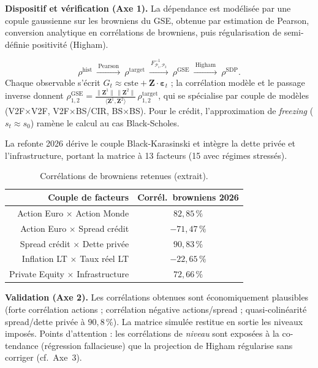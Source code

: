 \documentclass[11pt,a4paper]{article}
\renewcommand{\arraystretch}{1.4}
\newcommand{\tablehead}[1]{\textcolor{nxnavy}{\sffamily\bfseries\small #1}}
\begin{document}
\textbf{Dispositif et vérification (Axe 1).} La dépendance est modélisée par une copule gaussienne sur les browniens du GSE, obtenue par estimation de Pearson, conversion analytique en corrélations de browniens, puis régularisation de semi-définie positivité (Higham).
\begin{definitionbox}
\[
\rho^{\mathrm{hist}}\ \xrightarrow{\ \text{Pearson}\ }\ \rho^{\mathrm{target}}
\ \xrightarrow{\ F^{-1}_{\mathcal P_1,\mathcal P_2}\ }\ \rho^{\mathrm{GSE}}
\ \xrightarrow{\ \text{Higham}\ }\ \rho^{\mathrm{SDP}} .
\]
Chaque observable s'écrit $G_t\approx\text{cste}+\bm Z\cdot\bm\varepsilon_t$ ; la corrélation modèle et le passage inverse donnent $\rho^{\mathrm{GSE}}_{1,2}=\tfrac{\lVert\bm Z^1\rVert\,\lVert\bm Z^2\rVert}{\langle\bm Z^1,\bm Z^2\rangle}\,\rho^{\mathrm{target}}_{1,2}$, qui se spécialise par couple de modèles (V2F$\times$V2F, V2F$\times$BS/CIR, BS$\times$BS). Pour le crédit, l'approximation de \emph{freezing} ($s_t\approx s_0$) ramène le calcul au cas Black-Scholes.
\end{definitionbox}
La refonte 2026 dérive le couple Black-Karasinski et intègre la dette privée et l'infrastructure, portant la matrice à 13 facteurs (15 avec régimes stressés).

\begin{table}[H]
\centering\small
\renewcommand{\arraystretch}{1.4}\setlength{\tabcolsep}{6pt}
\begin{tabularx}{\linewidth}{R C}
\toprule
\tablehead{Couple de facteurs} & \tablehead{Corrél.\ browniens 2026} \\
\midrule
{} Action Euro $\times$ Action Monde & $82{,}85\,\%$ \\
Action Euro $\times$ Spread crédit & $-71{,}47\,\%$ \\
 Spread crédit $\times$ Dette privée & $90{,}83\,\%$ \\
Inflation LT $\times$ Taux réel LT & $-22{,}65\,\%$ \\
 Private Equity $\times$ Infrastructure & $72{,}66\,\%$ \\
\bottomrule
\end{tabularx}
\caption{Corrélations de browniens retenues (extrait).}
\end{table}

\textbf{Validation (Axe 2).} Les corrélations obtenues sont économiquement plausibles (forte corrélation actions ; corrélation négative actions/spread ; quasi-colinéarité spread/dette privée à $90{,}8\,\%$). La matrice simulée restitue en sortie les niveaux imposés. Points d'attention : les corrélations de \emph{niveau} sont exposées à la co-tendance (régression fallacieuse) que la projection de Higham régularise sans corriger (cf.\ Axe~3).
\end{document}
